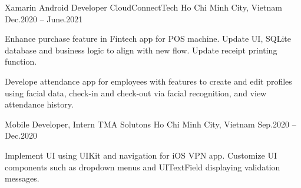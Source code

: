 \begin{cventries}
    \cventry
    {Xamarin Android Developer}
    {CloudConnectTech}
    {Ho Chi Minh City, Vietnam}
    {Dec.2020 -- June.2021}
    {
        \begin{cvitems}
            \item {
                Enhance purchase feature in Fintech app for POS machine.
                Update UI, SQLite database and business logic to align with new flow.
                Update receipt printing function.
            }
            \item {
                Develope attendance app for employees with features to create and edit profiles using facial data,
                check-in and check-out via facial recognition,
                and view attendance history.
            }
        \end{cvitems}
    }

    \cventry
    {Mobile Developer, Intern}
    {TMA Solutons}
    {Ho Chi Minh City, Vietnam}
    {Sep.2020 -- Dec.2020}
    {
        \begin{cvitems}
            \item {
                Implement UI using UIKit and navigation for iOS VPN app.
                Customize UI components such as dropdown menus and UITextField displaying validation messages.
            }
        \end{cvitems}
    }

\end{cventries}
